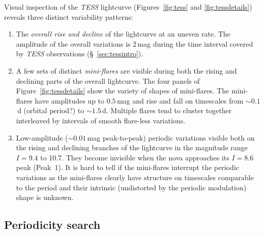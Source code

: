 \documentclass[twocolumn]{aastex631}
\begin{document}
Visual inspection of the {\em TESS} lightcurve (Figures~\ref{fig:tess} and \ref{fig:tessdetails}) 
reveals three distinct variability patterns:
\begin{enumerate}
\item The {\it overall rise and decline} of the lightcurve at an uneven rate. 
The amplitude of the overall variations is 2\,mag during the time interval
covered by {\em TESS} observations (\S~\ref{sec:tessintro}).
\item A few sets of distinct {\it mini-flares} are visible during both the
rising and declining parts of the overall lightcurve. 
The four panels of Figure~\ref{fig:tessdetails} show the variety of shapes of mini-flares.
The mini-flares have amplitudes up to $0.5$\,mag and rise and fall on timescales
from $\sim 0.1$\,d (orbital period?) to $\sim1.5$\,d. Multiple flares tend to cluster
together interleaved by intervals of smooth flare-less variations.
\item Low-amplitude ($\sim0.01$\,mag peak-to-peak) periodic variations %
visible both on the rising and declining branches of the lightcurve in the
magnitude range $I=9.4$ to 10.7. They become invisible when the nova approaches its 
$I=8.6$ peak (Peak~1). It is hard to tell if the mini-flares interrupt the
periodic variations as the mini-flares clearly have structure on timescales
comparable to the period and their intrinsic (undistorted by the periodic
modulation) shape is unknown.
\end{enumerate}


\subsection{Periodicity search}
\label{sec:periodic}
\end{document}
